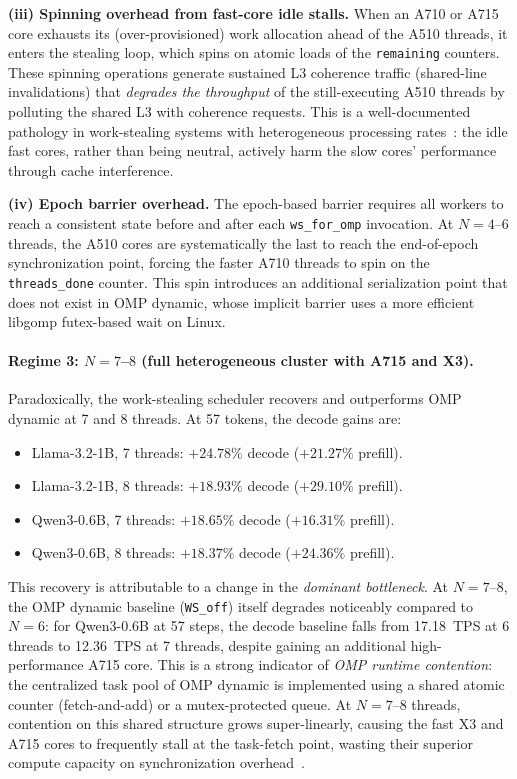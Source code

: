\documentclass[11pt,english]{article}
\begin{document}
\textbf{(iii) Spinning overhead from fast-core idle stalls.} When an A710 or A715 core exhausts its (over-provisioned) work allocation ahead of the A510 threads, it enters the stealing loop, which spins on atomic loads of the \texttt{remaining} counters. These spinning operations generate sustained L3 coherence traffic (shared-line invalidations) that \emph{degrades the throughput} of the still-executing A510 threads by polluting the shared L3 with coherence requests. This is a well-documented pathology in work-stealing systems with heterogeneous processing rates~\cite{yanghe2018survey}: the idle fast cores, rather than being neutral, actively harm the slow cores' performance through cache interference.
 
\textbf{(iv) Epoch barrier overhead.} The epoch-based barrier requires all workers to reach a consistent state before and after each \texttt{ws\_for\_omp} invocation. At $N=4$--$6$ threads, the A510 cores are systematically the last to reach the end-of-epoch synchronization point, forcing the faster A710 threads to spin on the \texttt{threads\_done} counter. This spin introduces an additional serialization point that does not exist in OMP dynamic, whose implicit barrier uses a more efficient libgomp futex-based wait on Linux.
 
\paragraph{Regime 3: $N = 7$--$8$ (full heterogeneous cluster with A715 and X3).}
 
Paradoxically, the work-stealing scheduler recovers and outperforms OMP dynamic at 7 and 8 threads. At 57 tokens, the decode gains are:
 
\begin{itemize}
    \item Llama-3.2-1B, 7 threads: $\mathbf{+24.78\%}$ decode ($+21.27\%$ prefill).
    \item Llama-3.2-1B, 8 threads: $\mathbf{+18.93\%}$ decode ($+29.10\%$ prefill).
    \item Qwen3-0.6B, 7 threads: $\mathbf{+18.65\%}$ decode ($+16.31\%$ prefill).
    \item Qwen3-0.6B, 8 threads: $\mathbf{+18.37\%}$ decode ($+24.36\%$ prefill).
\end{itemize}
 
This recovery is attributable to a change in the \emph{dominant bottleneck}. At $N=7$--$8$, the OMP dynamic baseline (\texttt{WS\_off}) itself degrades noticeably compared to $N=6$: for Qwen3-0.6B at 57 steps, the decode baseline falls from 17.18~TPS at 6 threads to 12.36~TPS at 7 threads, despite gaining an additional high-performance A715 core. This is a strong indicator of \emph{OMP runtime contention}: the centralized task pool of OMP dynamic is implemented using a shared atomic counter (fetch-and-add) or a mutex-protected queue. At $N=7$--$8$ threads, contention on this shared structure grows super-linearly, causing the fast X3 and A715 cores to frequently stall at the task-fetch point, wasting their superior compute capacity on synchronization overhead~\cite{yanghe2018survey}.
 
\end{document}
